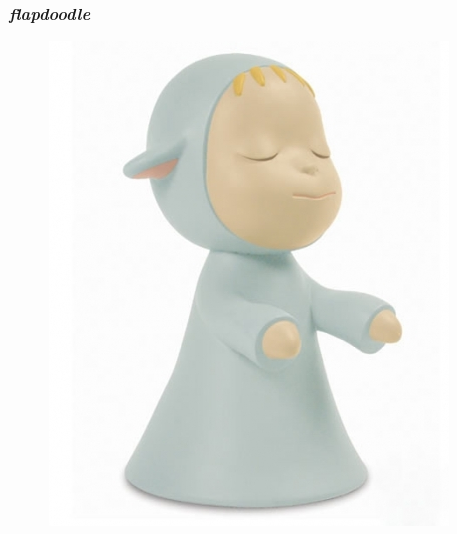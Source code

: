 \documentclass[compress=true]{beamer}
\begin{document}
\begin{frame}
  \frametitle{\it flapdoodle}
  \begin{figure}
    \includegraphics[height=0.68\textheight]{mengyou.jpg}
  \end{figure}
\end{frame}
\end{document}
